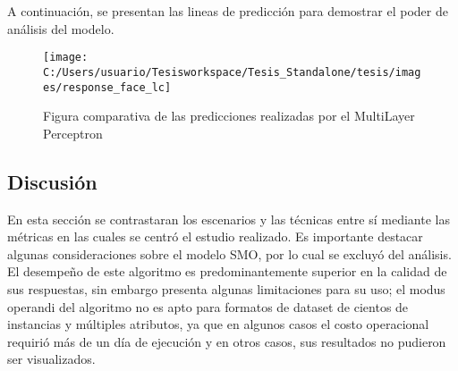 A continuación, se presentan las lineas de predicción para demostrar
el poder de análisis del modelo.

\begin{figure}[H]
\begin{centering}
\texttt{[image: C:/Users/usuario/Tesisworkspace/Tesis\_Standalone/tesis/images/response\_face\_lc]}
\par\end{centering}

\caption{Figura comparativa de las predicciones realizadas por el MultiLayer
Perceptron}
\end{figure}



\subsection{Discusión}

En esta sección se contrastaran los escenarios y las técnicas entre
sí mediante las métricas en las cuales se centró el estudio realizado.
Es importante destacar algunas consideraciones sobre el modelo \ac{SMO},
por lo cual se excluyó del análisis. El desempeño de este algoritmo
es predominantemente superior en la calidad de sus respuestas, sin
embargo presenta algunas limitaciones para su uso; el modus operandi
del algoritmo no es apto para formatos de dataset de cientos de instancias
y múltiples atributos, ya que en algunos casos el costo operacional
requirió más de un día de ejecución y en otros casos, sus resultados
no pudieron ser visualizados. 

\begin{table}[H]

\caption{Especificaciones de los dispositivos móviles utilizados. \label{tab:CC-results}}
\end{table}


